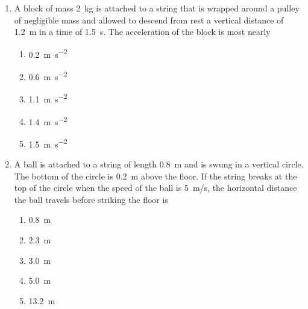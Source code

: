 \documentclass{../../../oss-apphys}
\begin{document}
\begin{multicols}{2}
\begin{enumerate}[resume,leftmargin=18pt]
  \item A block of mass \SI{2}{\kilo\gram} is attached to a string that is
    wrapped around a pulley of negligible mass and allowed to descend from rest
    a vertical distance of \SI{1.2}{\metre} in a time of \SI{1.5}{\second}. The
    acceleration of the block is most nearly
    \begin{center}
      \vspace{-.2in}
    \end{center}
    \begin{enumerate}[noitemsep,topsep=0pt,leftmargin=18pt,label=(\Alph*)]
    \item\SI{0.2}{\metre\per\second^2}
    \item\SI{.6}{\metre\per\second^2}
    \item\SI{1.1}{\metre\per\second^2}
    \item\SI{1.4}{\metre\per\second^2}
    \item\SI{1.5}{\metre\per\second^2}
    \end{enumerate}

    
  \item A ball is attached to a string of length \SI{.8}{\metre} and is swung
    in a vertical circle. The bottom of the circle is \SI{.2}{\metre} above the
    floor. If the string breaks at the top of the circle when the speed of the
    ball is \SI{5}{m/s}, the horizontal distance the ball travels before
    striking the floor is
    \begin{center}
      \vspace{-.2in}
    \end{center}
    \begin{enumerate}[noitemsep,topsep=0pt,leftmargin=18pt,label=(\Alph*)]
    \item\SI{.8 }{\metre}
    \item\SI{2.3 }{\metre}
    \item\SI{3.0 }{\metre}
    \item\SI{5.0 }{\metre}
    \item\SI{13.2}{\metre}
    \end{enumerate}
    

\end{enumerate}
\end{multicols}
\end{document}
